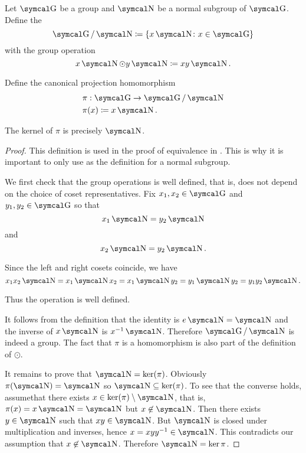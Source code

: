 \begin{definition}\label{def:quotient_group}
  Let \( \CG \) be a group and \( \CN \) be a normal subgroup of \( \CG \). Define the 
  \begin{equation*}
    \CG / \CN \coloneqq \{ x \CN \colon x \in \CG \}
  \end{equation*}
  with the group operation
  \begin{equation*}
    x \CN \odot y \CN \coloneqq xy \CN.
  \end{equation*}

  Define the canonical projection homomorphism
  \begin{align*}
     &\pi: \CG \to \CG / \CN \\
     &\pi(x) \coloneqq x \CN.
  \end{align*}

  The kernel of \( \pi \) is precisely \( \CN \).
\end{definition}
\begin{proof}
  This definition is used in the proof of equivalence in . This is why it is important to only use  as the definition for a normal subgroup.

  We first check that the group operations is well defined, that is, does not depend on the choice of coset representatives. Fix \( x_1, x_2 \in \CG \) and \( y_1, y_2 \in \CG \) so that
  \begin{equation*}
    x_1 \CN = y_2 \CN
  \end{equation*}
  and
  \begin{equation*}
    x_2 \CN = y_2 \CN.
  \end{equation*}

  Since the left and right cosets coincide, we have
  \begin{equation*}
    x_1 x_2 \CN = x_1 \CN x_2 = x_1 \CN y_2 = y_1 \CN y_2 = y_1 y_2 \CN.
  \end{equation*}

  Thus the operation is well defined.

  It follows from the definition that the identity is \( e \CN = \CN \) and the inverse of \( x \CN \) is \( x^{-1} \CN \). Therefore \( \CG / \CN \) is indeed a group. The fact that \( \pi \) is a homomorphism is also part of the definition of \( \odot \).

  It remains to prove that \( \CN = \ker(\pi) \). Obviously \( \pi(\CN) = \CN \) so \( \CN \subseteq \ker(\pi) \). To see that the converse holds, assume\LEM that there exists \( x \in \ker(\pi) \setminus \CN \), that is, \( \pi(x) = x\CN = \CN \) but \( x \not\in \CN \). Then there exists \( y \in \CN \) such that \( xy \in \CN \). But \( \CN \) is closed under multiplication and inverses, hence \( x = xyy^{-1} \in \CN \). This contradicts our assumption that \( x \not\in \CN \). Therefore \( \CN = \ker \pi \).
\end{proof}

